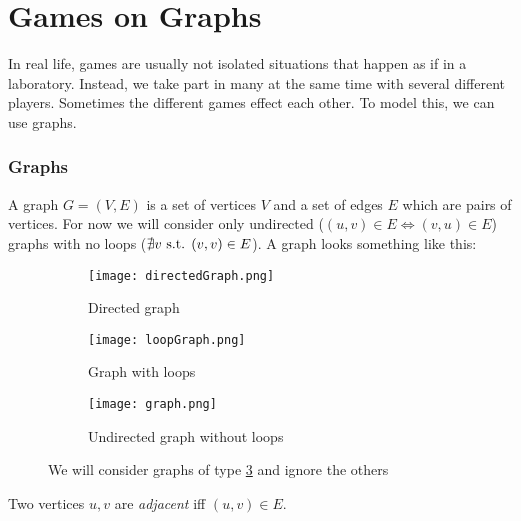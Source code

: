\section{Games on Graphs}
In real life, games are usually not isolated situations that happen as if in a laboratory. Instead, we take part in many at the same time with several different players. Sometimes the different games effect each other. To model this, we can use graphs.
\subsubsection{Graphs}
A graph $G=(V,E)$ is a set of vertices $V$ and a set of edges $E$ which are pairs of vertices. For now we will consider only undirected ($(u,v)\in E\iff(v,u)\in E$) graphs with no loops ($\nexists v\textnormal{ s.t. } (v,v)\in E$). A graph looks something like this:\\
\begin{figure}
	\centering
	\begin{subfigure}{.3\textwidth}
		\centering
		\texttt{[image: directedGraph.png]}
		\caption{Directed graph}
		\label{fig:dir}
	\end{subfigure}%
	\begin{subfigure}{.3\textwidth}
		\centering
		\texttt{[image: loopGraph.png]}
		\caption{Graph with loops}
		\label{fig:loop}
	\end{subfigure}
	\begin{subfigure}{.3\textwidth}
		\centering
		\texttt{[image: graph.png]}
		\caption{Undirected graph without loops}
		\label{fig:undirected}
	\end{subfigure}
	\caption{We will consider graphs of type \ref{fig:undirected} and ignore the others}
	\label{fig:complete graphs}
\end{figure}
Two vertices $u,v$ are \textit{adjacent} iff $(u,v)\in E$.

